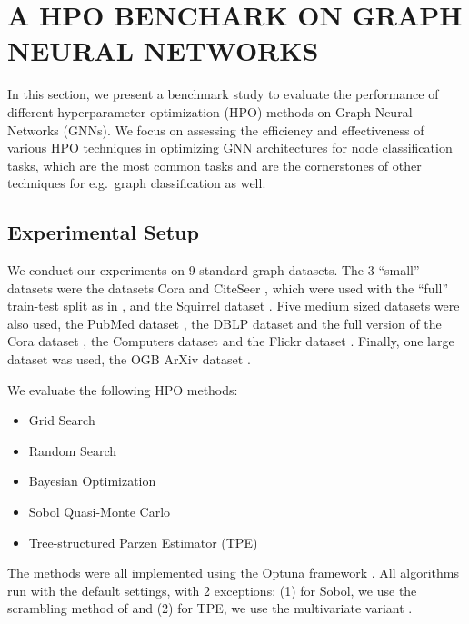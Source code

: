 \section{\uppercase{A HPO Benchark on Graph Neural Networks}}
\label{sec:benchmark}

In this section, we present a benchmark study to evaluate the performance of different hyperparameter optimization (HPO) methods on Graph Neural Networks (GNNs). We focus on assessing the efficiency and effectiveness of various HPO techniques in optimizing GNN architectures for node classification tasks, which are the most common tasks and are the cornerstones of other techniques for e.g.\ graph classification as well.

\subsection{Experimental Setup}
We conduct our experiments on 9 standard graph datasets. The 3 \enquote{small} datasets were the datasets Cora and CiteSeer \cite{yang_revisiting_2016}, which were used with the \enquote{full} train-test split as in \cite{chen_fastgcn_2018}, and the Squirrel dataset \cite{rozemberczki_multi-scale_2021}. Five medium sized datasets were also used, the PubMed dataset \cite{yang_revisiting_2016}, the DBLP dataset and the full version of the Cora dataset \cite{bojchevski_deep_2018}, the Computers dataset \cite{shchur_pitfalls_2019} and the Flickr dataset \cite{zeng_graphsaint_2019}. Finally, one large dataset was used, the OGB ArXiv dataset \cite{hu_open_2021}.

We evaluate the following HPO methods:
\begin{itemize}
	\item Grid Search
	\item Random Search
	\item Bayesian Optimization \cite{rasmussen_gaussian_2003, snoek_practical_2012}
	\item Sobol Quasi-Monte Carlo \cite{sobol_distribution_1967, bergstra_random_2012}
	\item Tree-structured Parzen Estimator (TPE) \cite{bergstra_algorithms_2011}
\end{itemize}
The methods were all implemented using the Optuna framework \cite{akiba_optuna_2019}. All algorithms run with the default settings, with 2 exceptions: (1) for Sobol, we use the scrambling method of \cite{matousek_l2-discrepancy_1998} and (2) for TPE, we use the multivariate variant \cite{falkner_bohb_2018}.

